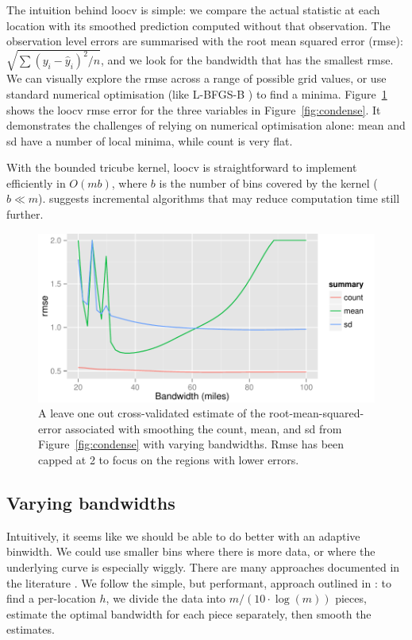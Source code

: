 \documentclass[journal]{vgtc}                %
\begin{document}
The intuition behind {\sc loocv} is simple: we compare the actual statistic at each location with its smoothed prediction computed without that observation. The observation level errors are summarised with the root mean squared error (rmse): $\sqrt{ \sum (y_i - \hat{y}_i)^2 / n}$, and we look for the bandwidth that has the smallest rmse. We can visually explore the rmse across a range of possible grid values, or use standard numerical optimisation (like L-BFGS-B \citep{byrd:1995}) to find a minima. Figure~\ref{fig:smooth-rmse} shows the {\sc loocv} rmse error for the three variables in Figure~\ref{fig:condense}. It demonstrates the challenges of relying on numerical optimisation alone: mean and sd have a number of local minima, while count is very flat.

With the bounded tricube kernel, {\sc loocv} is straightforward to implement efficiently in $O(m b)$, where $b$ is the number of bins covered by the kernel ($b \ll m$). \citep{fan:1994} suggests incremental algorithms that may reduce computation time still further.

\begin{figure}[htb]
 \centering
 \includegraphics[width=\linewidth]{smooth-rmse}
 \caption{A leave one out cross-validated estimate of the root-mean-squared-error associated with smoothing the count, mean, and sd from Figure~\ref{fig:condense} with varying bandwidths. Rmse has been capped at 2 to focus on the regions with lower errors.}
 \label{fig:smooth-rmse}
\end{figure}


\subsection{Varying bandwidths}

Intuitively, it seems like we should be able to do better with an adaptive binwidth. We could use smaller bins where there is more data, or where the underlying curve is especially wiggly. There are many approaches documented in the literature  \citep{terrell:1992, brockmann:1993,schucany:1995,herrmann:1997}. We follow the simple, but performant, approach outlined in \citep{fan:1995}: to find a per-location $h$, we divide the data into $m / (10 \cdot \log(m))$ pieces, estimate the optimal bandwidth for each piece separately, then smooth the estimates.
\end{document}
